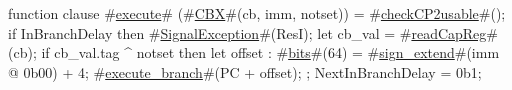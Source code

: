 function clause #\hyperref[zexecute]{execute}# (#\hyperref[zCBX]{CBX}#(cb, imm, notset)) =
{
  #\hyperref[zcheckCP2usable]{checkCP2usable}#();
  if InBranchDelay then
     #\hyperref[zSignalException]{SignalException}#(ResI);
  let cb_val = #\hyperref[zreadCapReg]{readCapReg}#(cb);
  if cb_val.tag ^ notset then
  {
    let offset : #\hyperref[zbits]{bits}#(64) = #\hyperref[zsignzyextend]{sign\_extend}#(imm @ 0b00) + 4;
    #\hyperref[zexecutezybranch]{execute\_branch}#(PC + offset);
  };
  NextInBranchDelay = 0b1;
}
